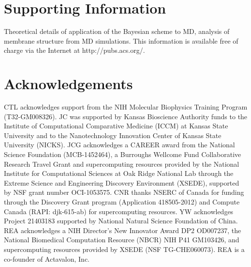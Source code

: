 









\section*{Supporting Information}
Theoretical details of application of the Bayesian scheme to MD, analysis of membrane structure from MD simulations. This information is available free of charge via the Internet at http://pubs.acs.org/.

\section*{Acknowledgements}
CTL acknowledges support from the NIH Molecular Biophysics Training Program (T32-GM008326).  JC was supported by Kansas Bioscience Authority funds to the Institute of Computational Comparative Medicine (ICCM) at Kansas State University and to the Nanotechnology Innovation Center of Kansas State University (NICKS).  JCG acknowledges a CAREER award from the National Science Foundation (MCB-1452464), a Burroughs Wellcome Fund Collaborative Research Travel Grant and supercomputing resources provided by the National Institute for Computational Sciences at Oak Ridge National Lab through the Extreme Science and Engineering Discovery Environment (XSEDE), supported by NSF grant number OCI-1053575.  CNR thanks NSERC of Canada for funding through the Discovery Grant program (Application 418505-2012) and Compute Canada (RAPI: djk-615-ab) for supercomputing resources.  YW acknowledges Project 21403183 supported by National Natural Science Foundation of China.  REA acknowledges a NIH Director's New Innovator Award DP2 OD007237, the National Biomedical Computation Resource (NBCR) NIH P41 GM103426, and supercomputing resources provided by XSEDE (NSF TG-CHE060073).  REA is a co-founder of Actavalon, Inc.
